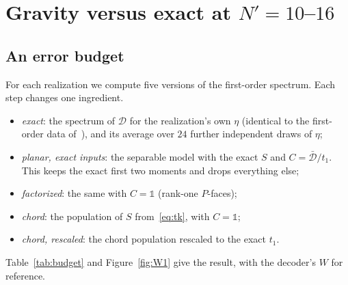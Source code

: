 \documentclass[11pt]{article}
\newcommand{\Np}{N'}
\newcommand{\one}{\mathds 1}
\newcommand{\Dc}{\mathcal D}
\newcommand{\Dbar}{\bar{\mathcal D}}
\theoremstyle{plain}
\theoremstyle{remark}
\numberwithin{equation}{section}
\begin{document}
\section{Gravity versus exact at \texorpdfstring{$\Np=10$--$16$}{N'=10-16}}\label{sec:tests}

\subsection{An error budget}

For each realization we compute five versions of the first-order spectrum. Each step changes one ingredient.
\begin{itemize}\itemsep1pt
\item \emph{exact}: the spectrum of $\Dc$ for the realization's own $\eta$ (identical to the first-order data
  of~\cite{prog1013}), and its average over $24$ further independent draws of $\eta$;
\item \emph{planar, exact inputs}: the separable model with the exact $S$ and $C=\Dbar/t_1$. This keeps the exact
  first two moments and drops everything else;
\item \emph{factorized}: the same with $C=\one$ (rank-one $P$-faces);
\item \emph{chord}: the population of $S$ from~\eqref{eq:tk}, with $C=\one$;
\item \emph{chord, rescaled}: the chord population rescaled to the exact $t_1$.
\end{itemize}
Table~\ref{tab:budget} and Figure~\ref{fig:W1} give the result, with the decoder's $W$ for reference.
\end{document}
